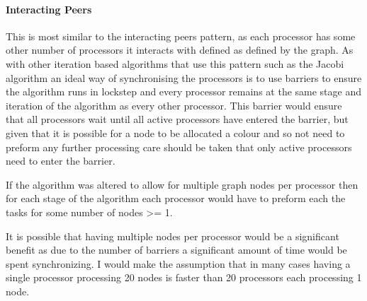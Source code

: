 \documentclass[11pt,a4paper]{article}
\begin{document}
%

\paragraph{Interacting Peers} This is most similar to the interacting peers pattern,
as each processor
has some other number of processors it interacts with defined as defined
by the graph. As with other iteration based algorithms that use this
pattern such as the Jacobi algorithm an ideal way of synchronising the
processors is to use barriers to ensure the algorithm runs in lockstep
and every processor remains at the same stage and iteration of the
algorithm as every other processor. This barrier would ensure that all
processors wait until all active processors have entered the barrier,
but given that it is possible for a node to be allocated a colour and so
not need to preform any further processing care should be taken that
only active processors need to enter the barrier.

If the algorithm was altered to allow for multiple graph nodes per
processor then for each stage of the algorithm each processor would have
to preform each the tasks for some number of nodes >= 1. 

It is possible that having multiple nodes per processor would be a significant benefit as
due to the number of barriers a significant amount of time would be spent synchronizing.
I would make the assumption that in many cases having a single processor processing 20 nodes is
faster than 20 processors each processing 1 node.
\end{document}
